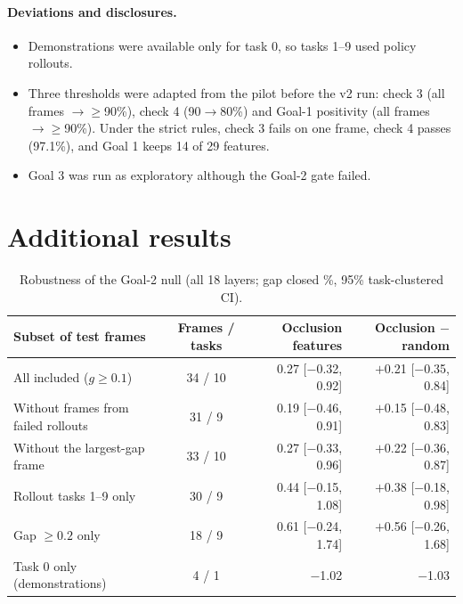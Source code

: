 \documentclass{article} %
\begin{document}
\paragraph{Deviations and disclosures.}
\begin{itemize}[leftmargin=*,itemsep=0pt,topsep=1pt]
  \item Demonstrations were available only for task 0, so tasks 1--9 used policy rollouts.
  \item Three thresholds were adapted from the pilot before the v2 run: check 3 (all frames $\rightarrow\ge$90\%), check 4 (90$\rightarrow$80\%) and Goal-1 positivity (all frames $\rightarrow\ge$90\%). Under the strict rules, check 3 fails on one frame, check 4 passes (97.1\%), and Goal 1 keeps 14 of 29 features.
  \item Goal 3 was run as exploratory although the Goal-2 gate failed.
\end{itemize}

\clearpage
\section{Additional results}

\begin{table}[h]
\caption{Robustness of the Goal-2 null (all 18 layers; gap closed \%, 95\% task-clustered CI).}
\label{tab:robust}
\centering\small
\begin{tabular}{@{}lcrr@{}}
\toprule
Subset of test frames & Frames / tasks & Occlusion features & Occlusion $-$ random \\
\midrule
All included ($g\ge0.1$) & 34 / 10 & 0.27 [$-$0.32, 0.92] & $+$0.21 [$-$0.35, 0.84] \\
Without frames from failed rollouts & 31 / 9 & 0.19 [$-$0.46, 0.91] & $+$0.15 [$-$0.48, 0.83] \\
Without the largest-gap frame & 33 / 10 & 0.27 [$-$0.33, 0.96] & $+$0.22 [$-$0.36, 0.87] \\
Rollout tasks 1--9 only & 30 / 9 & 0.44 [$-$0.15, 1.08] & $+$0.38 [$-$0.18, 0.98] \\
Gap $\ge0.2$ only & 18 / 9 & 0.61 [$-$0.24, 1.74] & $+$0.56 [$-$0.26, 1.68] \\
Task 0 only (demonstrations) & 4 / 1 & $-$1.02 & $-$1.03 \\
\bottomrule
\end{tabular}
\end{table}
\end{document}

